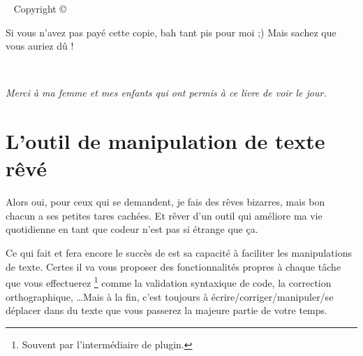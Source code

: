 



\frontmatter

\blankpage

\maketitle


\newpage
\begin{fullwidth}
~\vfill
\thispagestyle{empty}
\setlength{\parindent}{0pt}
\setlength{\parskip}{\baselineskip}
Copyright \copyright\ \the\year\ \thanklessauthor

\par{}

\par{}

\par Si vous n'avez pas payé cette copie, bah tant pis pour moi ;) Mais sachez que vous auriez dû !

\end{fullwidth}

\tableofcontents

\listoffigures

\listoftables

\cleardoublepage
~\vfill
\begin{doublespace}
\noindent\fontsize{18}{22}\selectfont\itshape
\nohyphenation
Merci à ma femme et mes enfants qui ont permis à ce livre de voir le jour.
\end{doublespace}
\vfill
\vfill

\cleardoublepage



\mainmatter




\chapter{L'outil de manipulation de texte rêvé}

Alors oui, pour ceux qui se demandent, je fais des rêves bizarres, mais bon chacun a ses petites tares cachées. Et rêver d'un outil qui améliore ma vie quotidienne en tant que codeur n'est pas si étrange que ça.

Ce qui fait et fera encore le succès de \vim est sa capacité à faciliter les manipulations de texte. Certes il va vous proposer des fonctionnalités propres à chaque tâche que vous effectuerez \footnote{Souvent par l'intermédiaire de plugin.} comme la validation syntaxique de code, la correction orthographique, \ldots Mais à la fin, c'est toujours à écrire/corriger/manipuler/se déplacer dans du texte que vous passerez la majeure partie de votre temps. 

